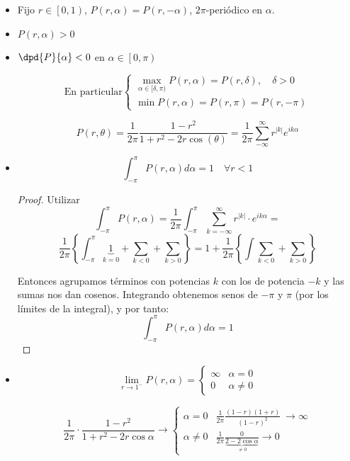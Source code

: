 		\begin{itemize}

			\item Fijo $r \in \left[ 0,1 \right)$, $P(r,\alpha) = P(r,-\alpha)$, $2\pi$-periódico en $\alpha$.

			\item $P(r,\alpha) > 0$

			\item $\dpd{P}{\alpha} < 0$ en $\alpha \in \left[ 0,\pi \right)$

			\[ \text{En particular} \begin{cases}
				\max\limits_{\alpha \in [\delta, \pi)} P(r,\alpha) = P(r,\delta), \quad \delta>0\\
				\min P(r,\alpha) = P(r,\pi) = P(r,-\pi)
			\end{cases} \]

			\obs \[ P(r, \theta) = \frac{1}{2\pi}\frac{1-r^2}{1+r^2-2r \cos(\theta)} = \frac{1}{2\pi} \sum_{-\infty}^\infty r^{|k|} e^{i k \alpha} \]

			\item \[
				\int_{-\pi}^\pi P(r, \alpha) d\alpha = 1 \quad \forall r < 1
			\]

			\begin{proof}
				Utilizar \[ \int_{-\pi}^\pi P(r, \alpha) = \frac{1}{2\pi} \int_{-\pi}^\pi \sum_{k=-\infty}^{\infty} r^{|k|} \cdot e^{ik\alpha}  = \]
				\[ \frac{1}{2\pi} \left\{ \int_{-\pi}^{\pi} \underbrace{1}_{k=0}  + \sum_{k<0} + \sum_{k>0} \right\} = 1 + \frac{1}{2\pi} \left\{ \int \sum_{k<0} + \sum_{k>0} \right\} \]

				Entonces agrupamos términos con potencias $k$ con los de potencia $-k$ y las sumas nos dan cosenos. Integrando obtenemos senos de $-\pi$ y $\pi$ (por los límites de la integral), y por tanto:
				\[\int_{-\pi}^{\pi} P(r, \alpha) d\alpha = 1\]
			\end{proof}


			\item \[
			\lim_{r \to 1^-} P(r, \alpha) = \begin{cases}
				\infty & \alpha = 0 \\
				0 & \alpha \neq 0
			\end{cases}
			\]

			\[
				\frac{1}{2\pi} \cdot \frac{1-r^2}{1+r^2-2r\cos \alpha} \rightarrow \begin{cases}
				\alpha = 0 & \frac{1}{2\pi} \frac{(1-r)(1+r)}{(1-r)^2} \ \rightarrow \infty \\
				\alpha \neq 0  & \frac{1}{2\pi} \frac{0}{\underbrace{2-2\cos \alpha}_{\neq 0}} \rightarrow 0
				\end{cases}
			\]


\end{itemize}

